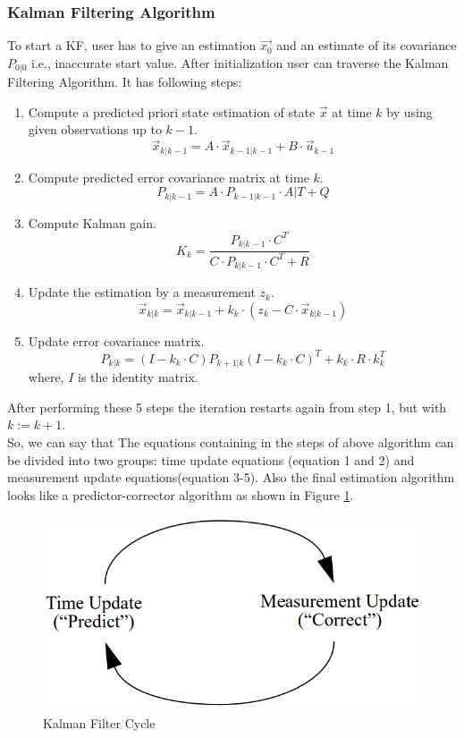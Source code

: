 \subsubsection{Kalman Filtering Algorithm}
To start a KF, user has to give an estimation $\vec{x_{0}}$ and an estimate of its covariance $P_{0|0}$ i.e., inaccurate start value. After initialization user can traverse the Kalman Filtering Algorithm. It has following steps\cite{Wilfried2002}:
\begin{enumerate}
  \item  Compute a predicted priori state estimation of state $\vec{x}$ at time $k$ by using given observations up to $k-1$.
  $$\vec{x}_{k|k-1} = A\cdot \vec{x}_{k-1|k-1} + B\cdot \vec{u}_{k-1}$$
  \item Compute predicted error covariance matrix at time $k$.
  $$P_{k|k-1} = A \cdot P_{k-1|k-1} \cdot A|{T} + Q$$
  \item Compute Kalman gain.
  $$K_{k} = \frac{P_{k|k-1} \cdot C^{T}}{C \cdot P_{k|k-1} \cdot C^{T} + R}$$
  \item Update the estimation by a measurement $z_{k}$.
  $$\vec{x}_{k|k} = \vec{x}_{k|k-1} + k_{k} \cdot (z_{k} - C \cdot \vec{x}_{k|k-1})$$
  \item Update error covariance matrix.
  $$P_{k|k} = (I - k_{k} \cdot C) P_{k+1|k} (I - k_{k} \cdot C)^{T} + k_{k} \cdot R \cdot k^{T}_{k}$$
  where, $I$ is the identity matrix.
\end{enumerate}

After performing these 5 steps the iteration restarts again from step 1, but with $k:=k+1$.\\
So, we can say that The equations containing in the steps of above algorithm can be divided into two groups: time update equations (equation 1 and 2) and measurement update equations(equation 3-5)\cite{bishop2001introduction}. Also the final estimation algorithm looks like  a predictor-corrector algorithm as shown in Figure \ref{fig:kalman_cycle}.

\begin{figure}
  \centering
  \includegraphics[width=.4\textwidth]{src/pic/kalman_cycle.png}
  \caption{Kalman Filter Cycle \cite{bishop2001introduction}}
  \label{fig:kalman_cycle}
\end{figure}

